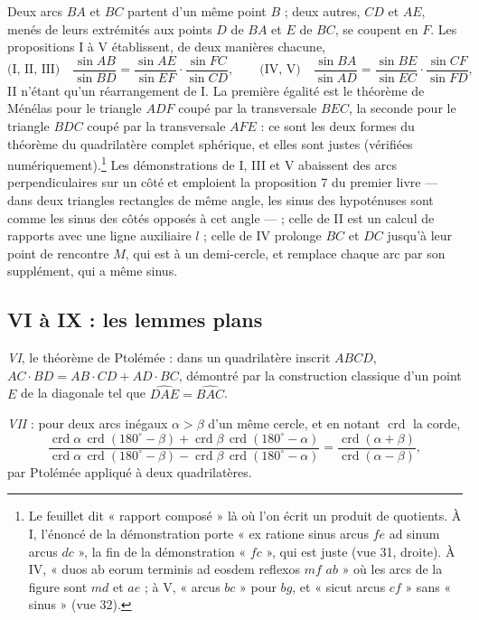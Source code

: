 \documentclass[11pt,a4paper]{article}
\begin{document}
Deux arcs $BA$ et $BC$ partent d'un même point $B$ ; deux autres, $CD$ et $AE$,
menés de leurs extrémités aux points $D$ de $BA$ et $E$ de $BC$, se coupent en $F$.
Les propositions I à V établissent, de deux manières chacune,
\[
\text{(I, II, III)}\quad
\frac{\sin AB}{\sin BD} = \frac{\sin AE}{\sin EF}\cdot\frac{\sin FC}{\sin CD},
\qquad
\text{(IV, V)}\quad
\frac{\sin BA}{\sin AD} = \frac{\sin BE}{\sin EC}\cdot\frac{\sin CF}{\sin FD},
\]
II n'étant qu'un réarrangement de I. La première égalité est le théorème de
Ménélas pour le triangle $ADF$ coupé par la transversale $BEC$, la seconde pour
le triangle $BDC$ coupé par la transversale $AFE$ : ce sont les deux formes du
théorème du quadrilatère complet sphérique, et elles sont justes (vérifiées
numériquement).\footnote{Le feuillet dit « rapport composé » là où l'on écrit un
produit de quotients. À I, l'énoncé de la démonstration porte « ex ratione sinus
arcus $fe$ ad sinum arcus $dc$ », la fin de la démonstration « $fc$ », qui est
juste (vue 31, droite). À IV, « duos ab eorum terminis ad eosdem reflexos $mf$
$ab$ » où les arcs de la figure sont $md$ et $ae$ ; à V, « arcus $bc$ » pour $bg$,
et « sicut arcus $cf$ » sans « sinus » (vue 32).} Les démonstrations de I, III et
V abaissent des arcs perpendiculaires sur un côté et emploient la proposition 7 du
premier livre — dans deux triangles rectangles de même angle, les sinus des
hypoténuses sont comme les sinus des côtés opposés à cet angle — ; celle de II
est un calcul de rapports avec une ligne auxiliaire $l$ ; celle de IV prolonge
$BC$ et $DC$ jusqu'à leur point de rencontre $M$, qui est à un demi-cercle, et
remplace chaque arc par son supplément, qui a même sinus.

\subsection*{VI à IX : les lemmes plans}

\emph{VI}, le théorème de Ptolémée : dans un quadrilatère inscrit $ABCD$,
$AC\cdot BD = AB\cdot CD + AD\cdot BC$, démontré par la construction classique d'un
point $E$ de la diagonale tel que $\widehat{DAE} = \widehat{BAC}$.

\emph{VII} : pour deux arcs inégaux $\alpha > \beta$ d'un même cercle, et en notant
$\operatorname{crd}$ la corde,
\[
\frac{\operatorname{crd}\alpha\,\operatorname{crd}(180^\circ-\beta) + \operatorname{crd}\beta\,\operatorname{crd}(180^\circ-\alpha)}
     {\operatorname{crd}\alpha\,\operatorname{crd}(180^\circ-\beta) - \operatorname{crd}\beta\,\operatorname{crd}(180^\circ-\alpha)}
= \frac{\operatorname{crd}(\alpha+\beta)}{\operatorname{crd}(\alpha-\beta)} ,
\]
par Ptolémée appliqué à deux quadrilatères.
\end{document}
